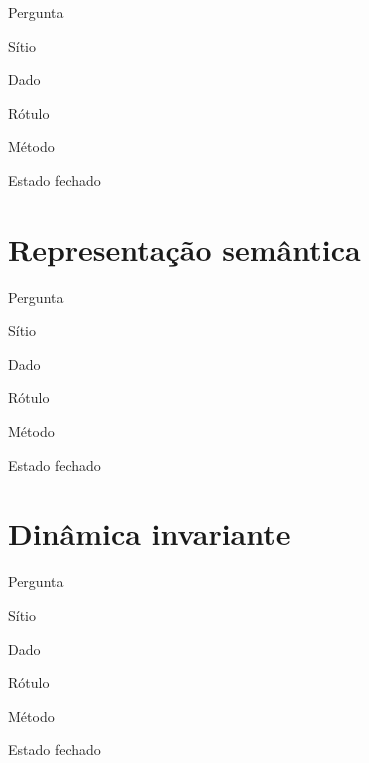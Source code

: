 \begin{ficha}
  \item[Pergunta] \lipsum[40][1]
  \item[Sítio]    \lipsum[41][2]
  \item[Dado]     \lipsum[42][3]
  \item[Rótulo]   \lipsum[43][1]
  \item[Método]   \lipsum[44][2]
  \item[Estado]   fechado
\end{ficha}

\lipsum[45][1-5]

\lipsum[46][1-4]

\conclusao{\lipsum[47][1-2]}

\begin{objecao}\lipsum[48][1-3]\end{objecao}


\section{Representação semântica}

\begin{ficha}
  \item[Pergunta] \lipsum[49][1]
  \item[Sítio]    \lipsum[50][2]
  \item[Dado]     \lipsum[51][3]
  \item[Rótulo]   \lipsum[52][1]
  \item[Método]   \lipsum[53][2]
  \item[Estado]   fechado
\end{ficha}

\lipsum[54][1-5]

\lipsum[55][1-4]

\conclusao{\lipsum[56][1-2]}

\begin{objecao}\lipsum[57][1-3]\end{objecao}


\section{Dinâmica invariante}

\begin{ficha}
  \item[Pergunta] \lipsum[58][1]
  \item[Sítio]    \lipsum[59][2]
  \item[Dado]     \lipsum[60][3]
  \item[Rótulo]   \lipsum[61][1]
  \item[Método]   \lipsum[62][2]
  \item[Estado]   fechado
\end{ficha}

\lipsum[63][1-5]

\lipsum[64][1-4]

\conclusao{\lipsum[65][1-2]}

\begin{objecao}\lipsum[66][1-3]\end{objecao}

